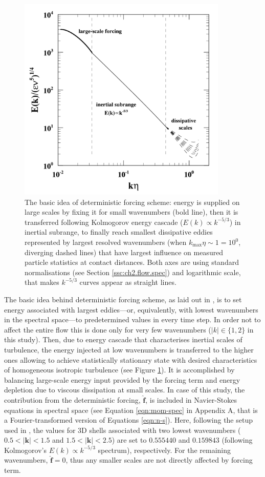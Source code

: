 \documentclass{pracamgren}
\begin{document}
\begin{figure}[h]
\centering
\includegraphics[width=10cm]{figures/1-01_forcing.pdf}
\caption{
The basic idea of deterministic forcing scheme: energy is supplied on large scales by fixing it for small wavenumbers (bold line), then it is transferred following Kolmogorov energy cascade ($E(k) \propto k^{-5/3}$) in inertial subrange, to finally reach smallest dissipative eddies represented by largest resolved wavenumbers (when $k_{\max} \eta \sim 1 = 10^0$, diverging dashed lines) that have largest influence on measured particle statistics at contact distances.
Both axes are using standard normalisations (see Section \ref{ssc:ch2.flow.spec}) and logarithmic scale, that makes $k^{-5/3}$ curves appear as straight lines.}
\label{fig:forcing}
\end{figure}

The basic idea behind deterministic forcing scheme, as laid out in \textcite{Sullivan1994}, is to set energy associated with largest eddies---or, equivalently, with lowest wavenumbers in the spectral space---to predetermined values in every time step.
In order not to affect the entire flow this is done only for very few wavenumbers ($|k| \in \{ 1, 2 \}$ in this study).
Then, due to energy cascade that characterises inertial scales of turbulence, the energy injected at low wavenumbers is transferred to the higher ones allowing to achieve statistically stationary state with desired characteristics of homogeneous isotropic turbulence (see Figure \ref{fig:forcing}).
It is accomplished by balancing large-scale energy input provided by the forcing term and energy depletion due to viscous dissipation at small scales. 
In case of this study, the contribution from the deterministic forcing, $\hat{\mathbf{f}}$, is included in Navier-Stokes equations in spectral space (see Equation \ref{eqn:mom-spec} in Appendix A, that is a Fourier-transformed version of Equations \ref{eqn:n-s}).
Here, following the setup used in \textcite[p. 6]{Rosa2011}, the values for 3D shells associated with two lowest wavenumbers ($0.5 < |\textbf{k}| < 1.5$ and $1.5 < |\textbf{k}| < 2.5$) are set to $0.555440$ and $0.159843$ (following Kolmogorov's $E(k) \propto k^{-5/3}$ spectrum), respectively.
For the remaining wavenumbers, $\hat{\mathbf{f}} = 0$, thus any smaller scales are not directly affected by forcing term.
\end{document}
